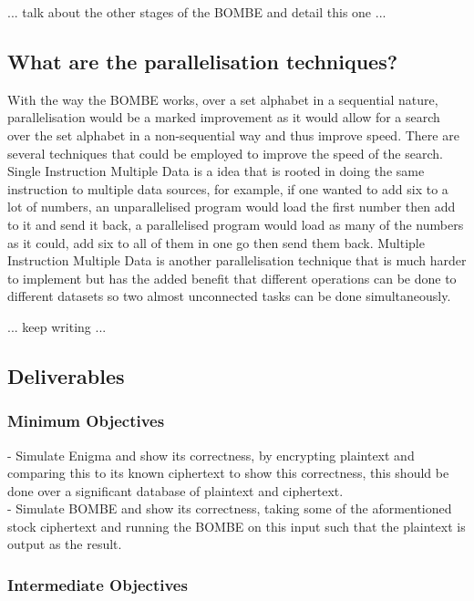 \documentclass[12pt,a4paper]{article}
\begin{document}
...
talk about the other stages of the BOMBE and detail this one
...

\subsection{What are the parallelisation techniques?}

With the way the BOMBE works, over a set alphabet in a sequential nature, parallelisation would be a marked improvement as it would allow for a search over the set alphabet in a non-sequential way and thus improve speed. There are several techniques that could be employed to improve the speed of the search. Single Instruction Multiple Data is a idea that is rooted in doing the same instruction to multiple data sources, for example, if one wanted to add six to a lot of numbers, an unparallelised program would load the first number then add to it and send it back, a parallelised program would load as many of the numbers as it could, add six to all of them in one go then send them back. Multiple Instruction Multiple Data is another parallelisation technique that is much harder to implement but has the added benefit that different operations can be done to different datasets so two almost unconnected tasks can be done simultaneously. 

...
keep writing
...

\subsection{Deliverables}

\subsubsection{Minimum Objectives}

- Simulate Enigma and show its correctness, by encrypting plaintext and comparing this to its known ciphertext to show this correctness, this should be done over a significant database of plaintext and ciphertext.\\
- Simulate BOMBE and show its correctness, taking some of the aformentioned stock ciphertext and running the BOMBE on this input such that the plaintext is output as the result.

\subsubsection{Intermediate Objectives}
\end{document}
